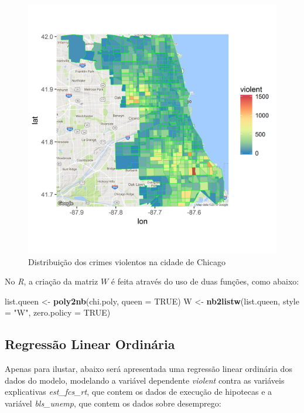 \documentclass[12pt,]{article}
\newenvironment{Shaded}{\begin{snugshade}}{\end{snugshade}}
\newcommand{\KeywordTok}[1]{\textcolor[rgb]{0.13,0.29,0.53}{\textbf{#1}}}
\newcommand{\DataTypeTok}[1]{\textcolor[rgb]{0.13,0.29,0.53}{#1}}
\newcommand{\StringTok}[1]{\textcolor[rgb]{0.31,0.60,0.02}{#1}}
\newcommand{\OtherTok}[1]{\textcolor[rgb]{0.56,0.35,0.01}{#1}}
\newcommand{\NormalTok}[1]{#1}
\begin{document}
\begin{figure}[H]

{\centering \includegraphics[width=0.65\linewidth]{sfiles/plot_mash-1} 

}

\caption{Distribuição dos crimes violentos na cidade de Chicago}\label{fig:plot_mash}
\end{figure}

No \emph{R}, a criação da matriz \(W\) é feita através do uso de duas
funções, como abaixo:

\begin{Shaded}
\begin{Highlighting}[]
\NormalTok{list.queen <-}\StringTok{ }\KeywordTok{poly2nb}\NormalTok{(chi.poly, }\DataTypeTok{queen =} \OtherTok{TRUE}\NormalTok{)}
\NormalTok{W <-}\StringTok{ }\KeywordTok{nb2listw}\NormalTok{(list.queen, }\DataTypeTok{style =} \StringTok{"W"}\NormalTok{, }\DataTypeTok{zero.policy =} \OtherTok{TRUE}\NormalTok{)}
\end{Highlighting}
\end{Shaded}

\subsection{Regressão Linear
Ordinária}\label{regressao-linear-ordinaria}

Apenas para ilustar, abaixo será apresentada uma regressão linear
ordinária dos dados do modelo, modelando a variável dependente
\emph{violent} contra as variáveis explicativas \emph{est\_fcs\_rt}, que
contem os dados de execução de hipotecas e a variável \emph{bls\_unemp},
que contem os dados sobre desemprego:
\end{document}

